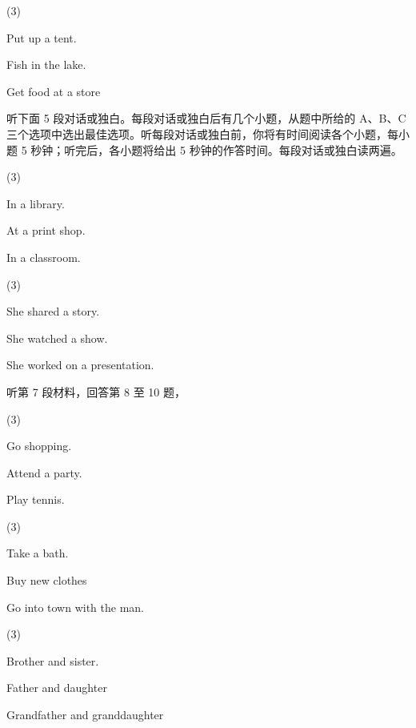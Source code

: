 \documentclass{英语试卷}
\begin{document}
\begin{choices}(3)
  \item Put up a tent.
  \item Fish in the lake.
  \item Get food at a store
\end{choices}
\par 听下面 5 段对话或独白。每段对话或独白后有几个小题，从题中所给的 A、B、C 三个选项中选出最佳选项。听每段对话或独白前，你将有时间阅读各个小题，每小题 5 秒钟；听完后，各小题将给出 5 秒钟的作答时间。每段对话或独白读两遍。\par
{}
\begin{choices}(3)
  \item In a library.
  \item At a print shop.
  \item In a classroom.
\end{choices}
\begin{choices}(3)
  \item She shared a story.
  \item She watched a show.
  \item She worked on a presentation.
\end{choices}
\par 听第 7 段材料，回答第 8 至 10 题，\par
{}
\begin{choices}(3)
  \item Go shopping.
  \item Attend a party.
  \item Play tennis.
\end{choices}
\begin{choices}(3)
  \item Take a bath.
  \item Buy new clothes
  \item Go into town with the man.
\end{choices}
\begin{choices}(3)
  \item Brother and sister.
  \item Father and daughter
  \item Grandfather and granddaughter
\end{choices}
\end{document}

